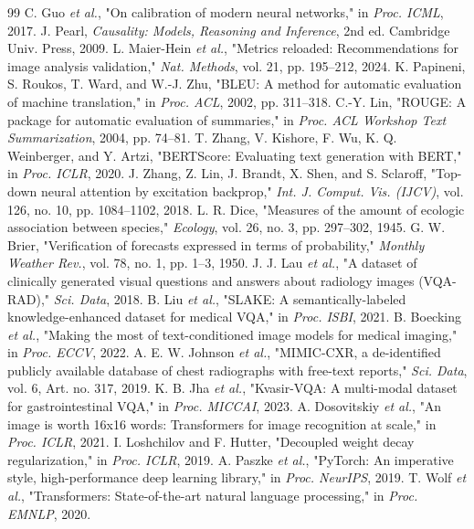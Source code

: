 \documentclass[journal,twoside,web]{ieeecolor}
\begin{document}
\begin{thebibliography}{99}
 C. Guo \textit{et al.}, "On calibration of modern neural networks," in \textit{Proc. ICML}, 2017.
 J. Pearl, \textit{Causality: Models, Reasoning and Inference}, 2nd ed. Cambridge Univ. Press, 2009.
 L. Maier-Hein \textit{et al.}, "Metrics reloaded: Recommendations for image analysis validation," \textit{Nat. Methods}, vol. 21, pp. 195--212, 2024.
 K. Papineni, S. Roukos, T. Ward, and W.-J. Zhu, "BLEU: A method for automatic evaluation of machine translation," in \textit{Proc. ACL}, 2002, pp. 311--318.
 C.-Y. Lin, "ROUGE: A package for automatic evaluation of summaries," in \textit{Proc. ACL Workshop Text Summarization}, 2004, pp. 74--81.
 T. Zhang, V. Kishore, F. Wu, K. Q. Weinberger, and Y. Artzi, "BERTScore: Evaluating text generation with BERT," in \textit{Proc. ICLR}, 2020.
 J. Zhang, Z. Lin, J. Brandt, X. Shen, and S. Sclaroff, "Top-down neural attention by excitation backprop," \textit{Int. J. Comput. Vis. (IJCV)}, vol. 126, no. 10, pp. 1084--1102, 2018.
 L. R. Dice, "Measures of the amount of ecologic association between species," \textit{Ecology}, vol. 26, no. 3, pp. 297--302, 1945.
 G. W. Brier, "Verification of forecasts expressed in terms of probability," \textit{Monthly Weather Rev.}, vol. 78, no. 1, pp. 1--3, 1950.
 J. J. Lau \textit{et al.}, "A dataset of clinically generated visual questions and answers about radiology images (VQA-RAD)," \textit{Sci. Data}, 2018.
 B. Liu \textit{et al.}, "SLAKE: A semantically-labeled knowledge-enhanced dataset for medical VQA," in \textit{Proc. ISBI}, 2021.
 B. Boecking \textit{et al.}, "Making the most of text-conditioned image models for medical imaging," in \textit{Proc. ECCV}, 2022.
 A. E. W. Johnson \textit{et al.}, "MIMIC-CXR, a de-identified publicly available database of chest radiographs with free-text reports," \textit{Sci. Data}, vol. 6, Art. no. 317, 2019.
 K. B. Jha \textit{et al.}, "Kvasir-VQA: A multi-modal dataset for gastrointestinal VQA," in \textit{Proc. MICCAI}, 2023.
 A. Dosovitskiy \textit{et al.}, "An image is worth 16x16 words: Transformers for image recognition at scale," in \textit{Proc. ICLR}, 2021.
 I. Loshchilov and F. Hutter, "Decoupled weight decay regularization," in \textit{Proc. ICLR}, 2019.
 A. Paszke \textit{et al.}, "PyTorch: An imperative style, high-performance deep learning library," in \textit{Proc. NeurIPS}, 2019.
 T. Wolf \textit{et al.}, "Transformers: State-of-the-art natural language processing," in \textit{Proc. EMNLP}, 2020.
\end{thebibliography}
\end{document}
